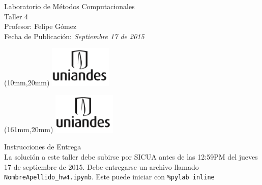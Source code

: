 \documentclass[11pt,letterpaper]{exam}
\begin{document}
\begin{center}
{\Large Laboratorio de Métodos Computacionales} \\
Taller 4 \\
Profesor: Felipe G\'omez\\
Fecha de Publicación: {\small \it Septiembre 17 de 2015}\\
\end{center}

\begin{textblock*}{40mm}(10mm,20mm)
  \includegraphics[width=3cm]{logoUniandes.png}
\end{textblock*}

\begin{textblock*}{40mm}(161mm,20mm)
  \includegraphics[width=3cm]{logoUniandes.png}
\end{textblock*}

\vspace{0.5cm}

{\Large Instrucciones de Entrega}\\

\noindent
La solución a este taller debe subirse por SICUA antes de las 12:59PM
del jueves 17 de septiembre de 2015. Debe entregarse un archivo llamado
\verb"NombreApellido_hw4.ipynb". Este puede iniciar con \verb"%pylab inline"
\end{document}

